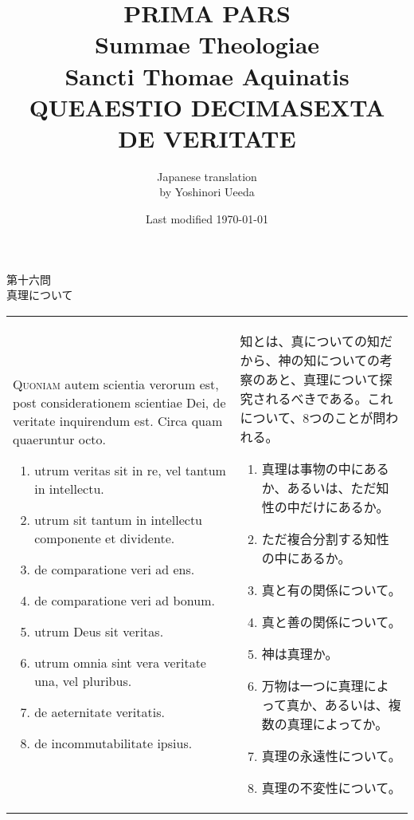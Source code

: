 \documentclass[10pt]{jsarticle} %
\title{{\bf PRIMA PARS}\\{\HUGE Summae Theologiae}\\Sancti Thomae
Aquinatis\\{\sffamily QUEAESTIO DECIMASEXTA}\\DE VERITATE}
\author{Japanese translation\\by Yoshinori {\sc Ueeda}}
\date{Last modified \today}
\begin{document}
\maketitle
\pagestyle{fancy}

\begin{center}
{\Large 第十六問\\真理について}
\end{center}

\begin{longtable}{p{21em}p{21em}}

{\huge Q}{\scshape uoniam} autem scientia verorum est, post
 considerationem scientiae Dei, de veritate inquirendum est. Circa quam
 quaeruntur octo. 

\begin{enumerate}
 \item utrum veritas sit in re, vel tantum in intellectu.
 \item utrum sit tantum in intellectu componente et dividente.
 \item de comparatione veri ad ens.
 \item de comparatione veri ad bonum.
 \item utrum Deus sit veritas.
 \item utrum omnia sint vera veritate una, vel pluribus.
 \item de aeternitate veritatis.
 \item de incommutabilitate ipsius.
\end{enumerate}


&

知とは、真についての知だから、神の知についての考察のあと、真理について探
 究されるべきである。これについて、8つのことが問われる。
\begin{enumerate}
 \item 真理は事物の中にあるか、あるいは、ただ知性の中だけにあるか。
 \item ただ複合分割する知性の中にあるか。
 \item 真と有の関係について。
 \item 真と善の関係について。
 \item 神は真理か。
 \item 万物は一つに真理によって真か、あるいは、複数の真理によってか。
 \item 真理の永遠性について。
 \item 真理の不変性について。
\end{enumerate}

\end{longtable}
\end{document}
